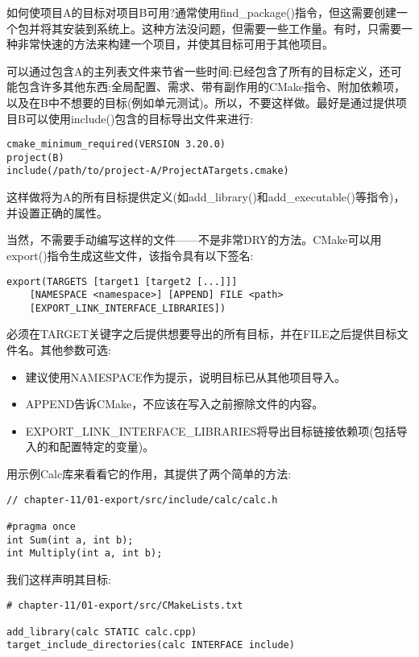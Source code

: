 如何使项目A的目标对项目B可用?通常使用find\_package()指令，但这需要创建一个包并将其安装到系统上。这种方法没问题，但需要一些工作量。有时，只需要一种非常快速的方法来构建一个项目，并使其目标可用于其他项目。

可以通过包含A的主列表文件来节省一些时间:已经包含了所有的目标定义，还可能包含许多其他东西:全局配置、需求、带有副作用的CMake指令、附加依赖项，以及在B中不想要的目标(例如单元测试)。所以，不要这样做。最好是通过提供项目B可以使用include()包含的目标导出文件来进行:

\begin{lstlisting}[style=styleCMake]
cmake_minimum_required(VERSION 3.20.0)
project(B)
include(/path/to/project-A/ProjectATargets.cmake)
\end{lstlisting}

这样做将为A的所有目标提供定义(如add\_library()和add\_executable()等指令)，并设置正确的属性。

当然，不需要手动编写这样的文件——不是非常DRY的方法。CMake可以用export()指令生成这些文件，该指令具有以下签名:

\begin{lstlisting}[style=styleCMake]
export(TARGETS [target1 [target2 [...]]]
	[NAMESPACE <namespace>] [APPEND] FILE <path>
	[EXPORT_LINK_INTERFACE_LIBRARIES])
\end{lstlisting}

必须在TARGET关键字之后提供想要导出的所有目标，并在FILE之后提供目标文件名。其他参数可选:

\begin{itemize}
\item 
建议使用NAMESPACE作为提示，说明目标已从其他项目导入。

\item 
APPEND告诉CMake，不应该在写入之前擦除文件的内容。

\item 
EXPORT\_LINK\_INTERFACE\_LIBRARIES将导出目标链接依赖项(包括导入的和配置特定的变量)。
\end{itemize}

用示例Calc库来看看它的作用，其提供了两个简单的方法:

\begin{lstlisting}[style=styleCXX]
// chapter-11/01-export/src/include/calc/calc.h

#pragma once
int Sum(int a, int b);
int Multiply(int a, int b);
\end{lstlisting}

我们这样声明其目标:

\begin{lstlisting}[style=styleCMake]
# chapter-11/01-export/src/CMakeLists.txt

add_library(calc STATIC calc.cpp)
target_include_directories(calc INTERFACE include)
\end{lstlisting}

